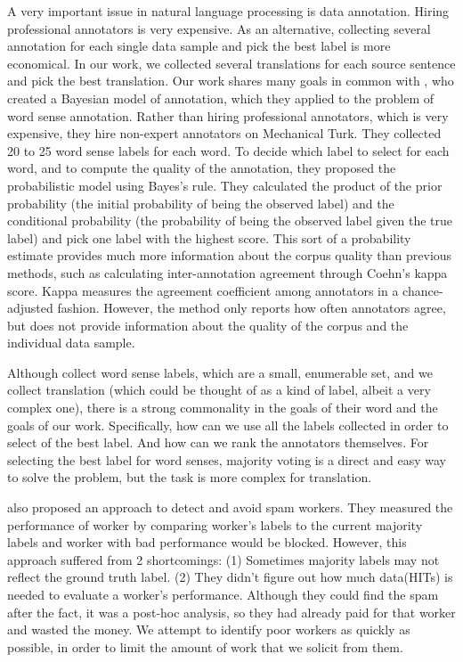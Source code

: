 \documentclass[11pt]{article}
\begin{document}
A very important issue in natural language processing is data annotation. Hiring professional annotators is very expensive. As an alternative, collecting several annotation for each single data sample and pick the best label is  more economical.  In our work, we collected several translations for each source sentence and pick the best translation. Our work shares many goals in common with , who created a Bayesian model of annotation, which they applied to the problem of word sense annotation. Rather than hiring professional annotators, which is very expensive, they hire non-expert annotators on Mechanical Turk.  They collected 20 to 25 word sense labels for each word. To decide which label to select for each word, and to compute the quality of the annotation, they proposed the probabilistic model using Bayes's rule. They calculated the product of the prior probability (the initial probability of being the observed label) and the conditional probability (the probability of being the observed label given the true label) and pick one label with the highest score. This sort of a probability estimate provides much more information about the corpus quality than previous methods, such as calculating inter-annotation agreement through Coehn's kappa score.  Kappa measures the agreement coefficient among annotators in a chance-adjusted fashion.  However, the method  only  reports how often annotators agree, but does not provide information about the quality of the corpus and the individual data sample.

Although  collect word sense labels, which are a small, enumerable set, and we collect translation (which could be thought of as a kind of label, albeit a very complex one), there is a strong commonality in the goals of their word and the goals of our work.  Specifically, how can we use all the labels collected in order to select of the best label.  And how can we rank the annotators themselves.  For selecting the best label for word senses, majority voting is a direct and easy way to solve the problem, but the task is more complex for translation. 

 also proposed an approach to detect and avoid spam workers. 
They measured the performance of worker by comparing worker's labels to the current majority labels and worker with bad performance would be blocked. However, this approach suffered from 2 shortcomings: (1) Sometimes majority labels may not reflect the ground truth label. (2) They didn't figure out  how much data(HITs) is needed to evaluate a worker's performance. Although they could find the spam after the fact, it was a post-hoc analysis, so they had already paid for that worker and wasted the money.  We attempt to identify poor workers as quickly as possible, in order to limit the amount of work that we solicit from them.
\end{document}
